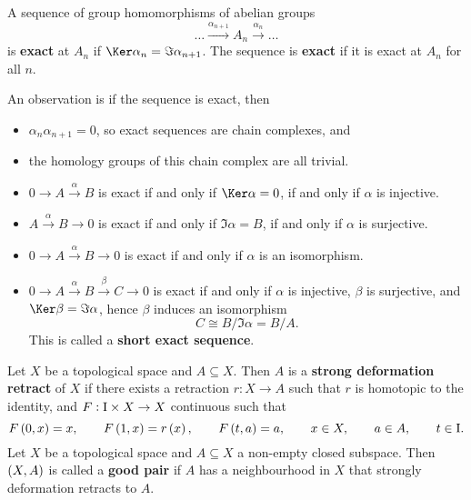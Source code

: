 \begin{definition*}
A sequence of group homomorphisms of abelian groups
$$ \dots \xrightarrow{\alpha_{n + 1}} A_n \xrightarrow{\alpha_n} \dots $$
is \textbf{exact} at $ A_n $ if $ \Ker \alpha_n = \Im \alpha_{n + 1} $. The sequence is \textbf{exact} if it is exact at $ A_n $ for all $ n $.
\end{definition*}

An observation is if the sequence is exact, then
\begin{itemize}
\item $ \alpha_n\alpha_{n + 1} = 0 $, so exact sequences are chain complexes, and
\item the homology groups of this chain complex are all trivial.
\end{itemize}

\begin{example*}
\hfill
\begin{itemize}
\item $ 0 \to A \xrightarrow{\alpha} B $ is exact if and only if $ \Ker \alpha = 0 $, if and only if $ \alpha $ is injective.
\item $ A \xrightarrow{\alpha} B \to 0 $ is exact if and only if $ \Im \alpha = B $, if and only if $ \alpha $ is surjective.
\item $ 0 \to A \xrightarrow{\alpha} B \to 0 $ is exact if and only if $ \alpha $ is an isomorphism.
\item $ 0 \to A \xrightarrow{\alpha} B \xrightarrow{\beta} C \to 0 $ is exact if and only if $ \alpha $ is injective, $ \beta $ is surjective, and $ \Ker \beta = \Im \alpha $, hence $ \beta $ induces an isomorphism
$$ C \cong B / \Im \alpha = B / A. $$
This is called a \textbf{short exact sequence}.
\end{itemize}
\end{example*}

\begin{definition*}
Let $ X $ be a topological space and $ A \subseteq X $. Then $ A $ is a \textbf{strong deformation retract} of $ X $ if there exists a retraction $ r : X \to A $ such that $ r $ is homotopic to the identity, and $ F : \mathrm{I} \times X \to X $ continuous such that
$$ F\br{0, x} = x, \qquad F\br{1, x} = r\br{x}, \qquad F\br{t, a} = a, \qquad x \in X, \qquad a \in A, \qquad t \in \I. $$
Let $ X $ be a topological space and $ A \subseteq X $ a non-empty closed subspace. Then $ \br{X, A} $ is called a \textbf{good pair} if $ A $ has a neighbourhood in $ X $ that strongly deformation retracts to $ A $.
\end{definition*}

